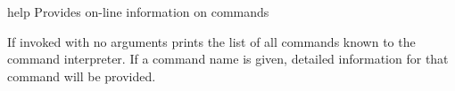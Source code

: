 \begin{nusmvCommand} {help} {Provides on-line information on commands}


If invoked with no arguments  prints the list of all
commands known to the command interpreter.  If a command name is
given, detailed information for that command will be provided.

\begin{cmdOpt}
\end{cmdOpt}

\end{nusmvCommand}
